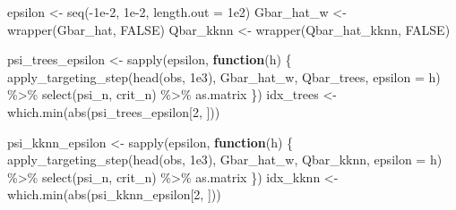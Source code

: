 \documentclass[
  11pt,
  openright,twoside]{book}
\newenvironment{Shaded}{\begin{snugshade}}{\end{snugshade}}
\newcommand{\AttributeTok}[1]{\textcolor[rgb]{0.77,0.63,0.00}{#1}}
\newcommand{\ConstantTok}[1]{\textcolor[rgb]{0.00,0.00,0.00}{#1}}
\newcommand{\ControlFlowTok}[1]{\textcolor[rgb]{0.13,0.29,0.53}{\textbf{#1}}}
\newcommand{\DecValTok}[1]{\textcolor[rgb]{0.00,0.00,0.81}{#1}}
\newcommand{\FloatTok}[1]{\textcolor[rgb]{0.00,0.00,0.81}{#1}}
\newcommand{\FunctionTok}[1]{\textcolor[rgb]{0.00,0.00,0.00}{#1}}
\newcommand{\NormalTok}[1]{#1}
\newcommand{\OtherTok}[1]{\textcolor[rgb]{0.56,0.35,0.01}{#1}}
\newcommand{\SpecialCharTok}[1]{\textcolor[rgb]{0.00,0.00,0.00}{#1}}
\theoremstyle{definition}
\theoremstyle{definition}
\theoremstyle{definition}
\theoremstyle{definition}
\theoremstyle{remark}
\begin{document}
\begin{Shaded}
\begin{Highlighting}[]
\NormalTok{epsilon }\OtherTok{\textless{}{-}} \FunctionTok{seq}\NormalTok{(}\SpecialCharTok{{-}}\FloatTok{1e{-}2}\NormalTok{, }\FloatTok{1e{-}2}\NormalTok{, }\AttributeTok{length.out =} \FloatTok{1e2}\NormalTok{)}
\NormalTok{Gbar\_hat\_w }\OtherTok{\textless{}{-}} \FunctionTok{wrapper}\NormalTok{(Gbar\_hat, }\ConstantTok{FALSE}\NormalTok{)}
\NormalTok{Qbar\_kknn }\OtherTok{\textless{}{-}} \FunctionTok{wrapper}\NormalTok{(Qbar\_hat\_kknn, }\ConstantTok{FALSE}\NormalTok{)}

\NormalTok{psi\_trees\_epsilon }\OtherTok{\textless{}{-}} \FunctionTok{sapply}\NormalTok{(epsilon, }\ControlFlowTok{function}\NormalTok{(h) \{}
  \FunctionTok{apply\_targeting\_step}\NormalTok{(}\FunctionTok{head}\NormalTok{(obs, }\FloatTok{1e3}\NormalTok{), Gbar\_hat\_w,}
\NormalTok{                       Qbar\_trees, }\AttributeTok{epsilon =}\NormalTok{ h) }\SpecialCharTok{\%\textgreater{}\%}
    \FunctionTok{select}\NormalTok{(psi\_n, crit\_n) }\SpecialCharTok{\%\textgreater{}\%}\NormalTok{ as.matrix}
\NormalTok{\})}
\NormalTok{idx\_trees }\OtherTok{\textless{}{-}} \FunctionTok{which.min}\NormalTok{(}\FunctionTok{abs}\NormalTok{(psi\_trees\_epsilon[}\DecValTok{2}\NormalTok{, ]))}

\NormalTok{psi\_kknn\_epsilon }\OtherTok{\textless{}{-}} \FunctionTok{sapply}\NormalTok{(epsilon, }\ControlFlowTok{function}\NormalTok{(h) \{}
  \FunctionTok{apply\_targeting\_step}\NormalTok{(}\FunctionTok{head}\NormalTok{(obs, }\FloatTok{1e3}\NormalTok{), Gbar\_hat\_w,}
\NormalTok{                       Qbar\_kknn, }\AttributeTok{epsilon =}\NormalTok{ h) }\SpecialCharTok{\%\textgreater{}\%}
    \FunctionTok{select}\NormalTok{(psi\_n, crit\_n) }\SpecialCharTok{\%\textgreater{}\%}\NormalTok{ as.matrix}
\NormalTok{\})}
\NormalTok{idx\_kknn }\OtherTok{\textless{}{-}} \FunctionTok{which.min}\NormalTok{(}\FunctionTok{abs}\NormalTok{(psi\_kknn\_epsilon[}\DecValTok{2}\NormalTok{, ]))}


\end{Highlighting}
\end{Shaded}
\end{document}
